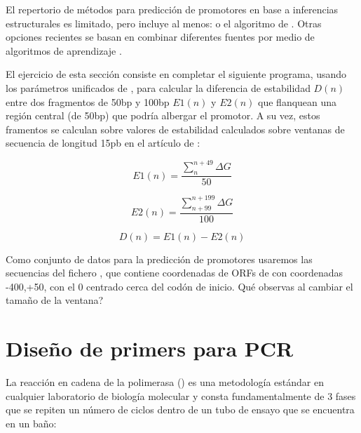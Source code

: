 El repertorio de m\'{e}todos para predicci\'{o}n de promotores en base a inferencias estructurales es limitado, pero incluye al menos: 
o el algoritmo de \citet{Song2012}. Otras opciones recientes se basan en combinar diferentes fuentes por medio de algoritmos de aprendizaje \citep{Eser2016}.

El ejercicio de esta secci\'{o}n consiste en completar el siguiente programa, usando los par\'{a}metros unificados de \cite{SantaLucia1998},
para calcular la diferencia de estabilidad $D(n)$ entre dos fragmentos de 50bp y 100bp $E1(n)$ y $E2(n)$ 
que flanquean una regi\'{o}n central (de 50bp) que podr\'{i}a albergar el promotor.
A su vez, estos framentos se calculan sobre valores de estabilidad calculados sobre ventanas de secuencia 
de longitud 15pb en el art\'{i}culo de \cite{Kanhere2005}:

\begin{equation}
E1(n) = \frac{\sum_{n}^{n+49}\Delta G}{50} 
\end{equation}

\begin{equation}
E2(n) = \frac{\sum_{n+99}^{n+199}\Delta G}{100} 
\end{equation}

\begin{equation}
D(n) = E1(n) - E2(n)
\end{equation}

Como conjunto de datos para la predicci\'{o}n de promotores usaremos las secuencias del fichero , 
que contiene coordenadas de ORFs de  con coordenadas -400,+50, con el 0 centrado cerca del cod\'{o}n de inicio.
Qu\'{e} observas al cambiar el tama\~no de la ventana?

\section{Dise\~no de primers para PCR} \label{dna2}

La reacci\'{o}n en cadena de la polimerasa 
()
es una metodolog\'{i}a est\'{a}ndar en cualquier laboratorio de biolog\'{i}a molecular y consta fundamentalmente
de 3 fases que se repiten un n\'{u}mero de ciclos dentro de un tubo de ensayo que se encuentra en un ba\~{n}o:

